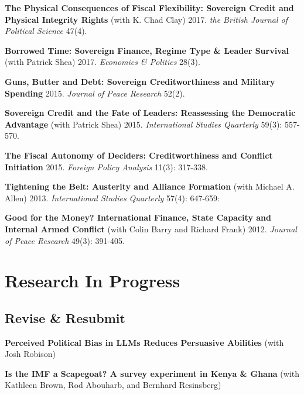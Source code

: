 \documentclass[letterpaper]{article}
\renewenvironment{itemize}{
  \begin{list}{}{
    \setlength{\leftmargin}{1.75em}
  }
}{
  \end{list}
}
\begin{document}
\begin{etaremune}
\item \textbf{The Physical Consequences of Fiscal Flexibility: Sovereign Credit and Physical Integrity Rights} (with K. Chad Clay) 2017. \emph{the British Journal of Political Science} 47(4).

\item \textbf{Borrowed Time: Sovereign Finance, Regime Type \& Leader Survival } (with Patrick Shea) 2017.  \emph{Economics \& Politics} 28(3).

 \item  \textbf{Guns, Butter and Debt: Sovereign Creditworthiness and Military Spending} 2015. \emph{Journal of Peace Research} 52(2).
 
\item \textbf{Sovereign Credit and the Fate of Leaders: Reassessing the Democratic Advantage} (with Patrick Shea) 2015. \emph{ International Studies Quarterly} 59(3): 557-570.

\item \textbf{The Fiscal Autonomy of Deciders: Creditworthiness and Conflict Initiation} 2015.  \emph{Foreign Policy Analysis} 11(3): 317-338.

\item \textbf{Tightening the Belt: Austerity and Alliance Formation} (with Michael A. Allen) 2013. \textit{International Studies Quarterly} 57(4): 647-659:  

\item \textbf{Good for the Money? International Finance, State Capacity and Internal Armed Conflict} (with Colin Barry and Richard Frank) 2012. {\it Journal
    of Peace Research} 49(3): 391-405.



\end{etaremune}

\section*{Research In Progress }

\subsection*{Revise \& Resubmit }
\begin{itemize}
\item \textbf{Perceived Political Bias in LLMs Reduces Persuasive Abilities} (with Josh Robison)

    \item \textbf{Is the IMF a Scapegoat? A survey experiment in Kenya \& Ghana} (with Kathleen Brown, Rod Abouharb, and Bernhard Resinsberg)
    

 \end{itemize}
\end{document}
